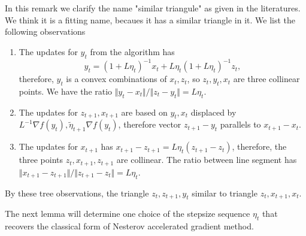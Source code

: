 \documentclass[12pt]{article}
\begin{document}
        \begin{remark}
            In this remark we clarify the name "similar triangule" as given in the literatures. 
            We think it is a fitting name, becaues it has a similar triangle in it. 
            We list the following observations
            \begin{enumerate}
                \item 
                The updates for $y_{t}$ from the algorithm has 
                $$
                    y_t = (1 + L\eta_t)^{-1} x_t + L\eta_t(1 + L\eta_t)^{-1} z_t, 
                $$
                therefore, $y_t$ is a convex combinations of $x_t, z_t$, so $z_t, y_t, x_t$ are three collinear points. 
                We have the ratio $\Vert y_t - x_t\Vert/\Vert z_t - y_t\Vert = L\eta_t$. 
                \item 
                The updates for $z_{t + 1}, x_{t + 1}$ are based on $y_t, x_t$ displaced by $L^{-1}\nabla f(y_t), \tilde\eta_{t +1}\nabla f(y_t)$, therefore vector $z_{t + 1} - y_t$ parallels to $x_{t + 1} - x_t$. 
                \item The updates for $x_{t + 1}$ has $x_{t + 1} - z_{t + 1} = L\eta_t \left(z_{t + 1} - z_t\right)$, therefore, the three points $z_t, x_{t + 1}, z_{t + 1}$ are collinear. 
                The ratio between line segment has $\Vert x_{t + 1} - z_{t + 1}\Vert/\Vert z_{t + 1} - z_t\Vert = L\eta_t$. 
            \end{enumerate}
            By these tree observations, the triangle $z_{t}, z_{t + 1}, y_t$ similar to triangle $z_t, x_{t + 1}, x_t$. 
        \end{remark}
        The next lemma will determine one choice of the stepsize sequence $\eta_t$ that recovers the classical form of Nesterov accelerated gradient method. 
\end{document}
